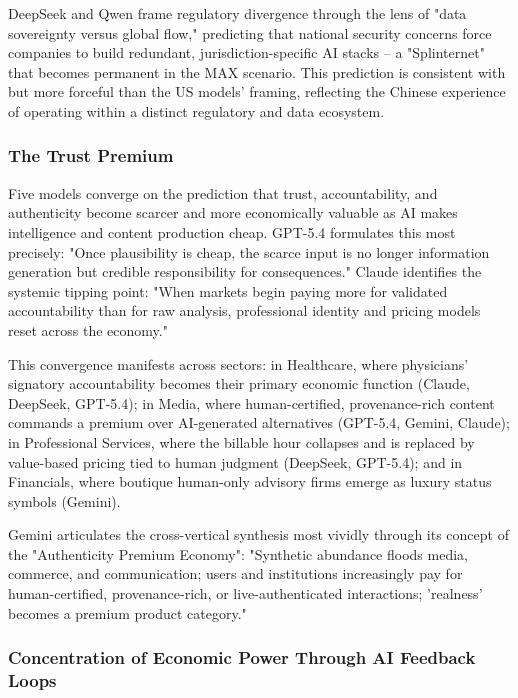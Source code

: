 \documentclass[preprint,review,12pt]{elsarticle}
\begin{document}
DeepSeek and Qwen frame regulatory divergence through the lens of "data sovereignty versus global flow," predicting that national security concerns force companies to build redundant, jurisdiction-specific AI stacks -- a "Splinternet" that becomes permanent in the MAX scenario. This prediction is consistent with but more forceful than the US models' framing, reflecting the Chinese experience of operating within a distinct regulatory and data ecosystem.


\subsubsection{The Trust Premium}
\label{sec:trust_premium}

Five models converge on the prediction that trust, accountability, and authenticity become scarcer and more economically valuable as AI makes intelligence and content production cheap. GPT-5.4 formulates this most precisely: "Once plausibility is cheap, the scarce input is no longer information generation but credible responsibility for consequences." Claude identifies the systemic tipping point: "When markets begin paying more for validated accountability than for raw analysis, professional identity and pricing models reset across the economy."

This convergence manifests across sectors: in Healthcare, where physicians' signatory accountability becomes their primary economic function (Claude, DeepSeek, GPT-5.4); in Media, where human-certified, provenance-rich content commands a premium over AI-generated alternatives (GPT-5.4, Gemini, Claude); in Professional Services, where the billable hour collapses and is replaced by value-based pricing tied to human judgment (DeepSeek, GPT-5.4); and in Financials, where boutique human-only advisory firms emerge as luxury status symbols (Gemini).

Gemini articulates the cross-vertical synthesis most vividly through its concept of the "Authenticity Premium Economy": "Synthetic abundance floods media, commerce, and communication; users and institutions increasingly pay for human-certified, provenance-rich, or live-authenticated interactions; 'realness' becomes a premium product category."


\subsubsection{Concentration of Economic Power Through AI Feedback Loops}
\label{sec:concentration}
\end{document}
